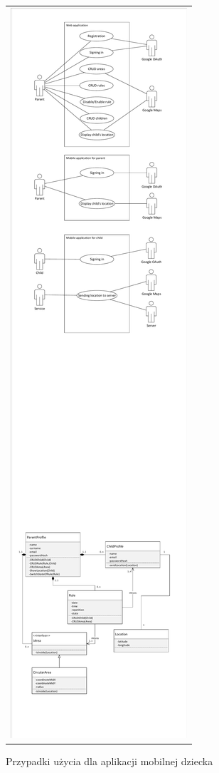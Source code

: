 \documentclass{sprawozdanie-agh}
\begin{document}
		\begin{figure}[H] 
			\centering
			\begin{tabular}{c}
				\includegraphics[width=.80\textwidth]{childUseCase} 
			\end{tabular} 
		\caption{Przypadki użycia dla aplikacji mobilnej dziecka}
		\end{figure}
\end{document}
